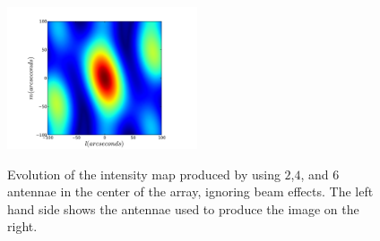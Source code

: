 \documentclass[11pt,letterpaper]{article}
\begin{document}
\begin{figure}[!h]
{\includegraphics[width=0.5\textwidth]{DFT_image_6closest_nobeam.pdf}
}
\caption{ Evolution of the intensity map produced by using $2$,$4$, and $6$ antennae in the center of the array, ignoring beam effects. The left hand side shows the antennae used to produce the image on the right.}
\label{fig:evolution_nobeam}
\end{figure}
\end{document}
